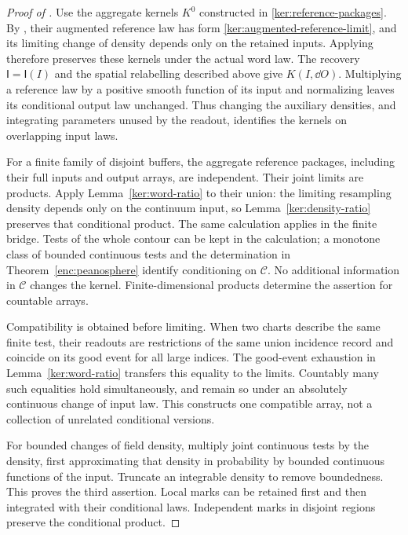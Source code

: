 \begin{proof}[Proof of ]
Use the aggregate kernels \(K^0\) constructed in
\eqref{ker:reference-packages}. By , their
augmented reference law has form
\eqref{ker:augmented-reference-limit}, and its limiting change of
density depends only on the retained inputs. Applying
 therefore preserves these kernels under the
actual word law. The recovery \(\mathsf I=\mathsf I(I)\) and the
spatial relabelling described above give \(K(I,\dd O)\).
Multiplying a reference law by a positive smooth function of its input
and normalizing leaves its conditional output law unchanged.  Thus
changing the auxiliary densities, and integrating parameters unused
by the readout, identifies the kernels on overlapping input laws.

For a finite family of disjoint buffers, the aggregate reference
packages, including their full inputs and output arrays, are independent.
Their joint limits are products.  Apply Lemma~\ref{ker:word-ratio}
to their union: the limiting resampling density depends only on the
continuum input, so Lemma~\ref{ker:density-ratio} preserves that
conditional product.  The same calculation applies in the finite
bridge.  Tests of the whole contour can be kept in the calculation;
a monotone class of bounded continuous tests and the determination
in Theorem~\ref{enc:peanosphere} identify conditioning on
\(\mathcal C\).  No additional information in \(\mathcal C\) changes
the kernel.  Finite-dimensional products determine the assertion for
countable arrays.

Compatibility is obtained before limiting.  When two charts describe
the same finite test, their readouts are restrictions of the same
union incidence record and coincide on its good event for all large
indices.  The good-event exhaustion in Lemma~\ref{ker:word-ratio}
transfers this equality to the limits.  Countably many such equalities
hold simultaneously, and remain so under an absolutely continuous
change of input law.  This constructs one compatible array, not a
collection of unrelated conditional versions.

For bounded changes of field density, multiply joint continuous tests
by the density, first approximating that density in probability by
bounded continuous functions of the input.  Truncate an integrable
density to remove boundedness.  This proves the third assertion.
Local marks can be retained first and then integrated with their
conditional laws.  Independent marks in disjoint regions preserve
the conditional product.


\end{proof}

